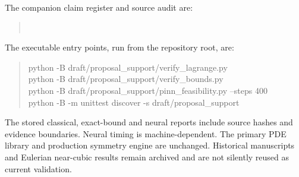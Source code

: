 \documentclass[11pt,a4paper]{article}
\theoremstyle{definition}
\theoremstyle{remark}
\begin{document}
The companion claim register and source audit are:
\begin{quote}\small
{}\\
\end{quote}
The executable entry points, run from the repository root, are:
\begin{quote}\small\ttfamily
python -B draft/proposal\_support/verify\_lagrange.py\\
python -B draft/proposal\_support/verify\_bounds.py\\
python -B draft/proposal\_support/pinn\_feasibility.py --steps 400\\
python -B -m unittest discover -s draft/proposal\_support
\end{quote}
The stored classical, exact-bound and neural reports include source hashes and evidence boundaries. Neural timing is machine-dependent. The primary PDE library and production symmetry engine are unchanged. Historical manuscripts and Eulerian near-cubic results remain archived and are not silently reused as current validation.


\end{document}

